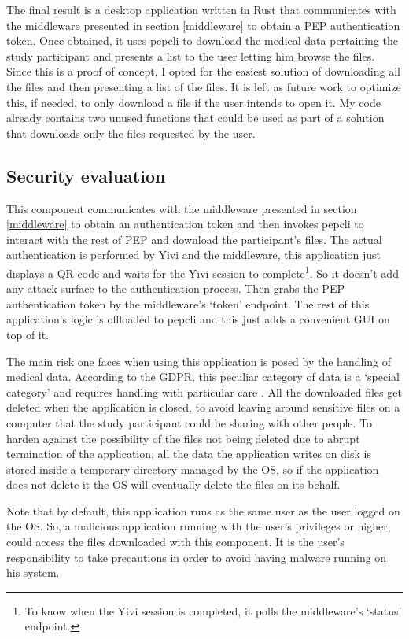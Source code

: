 \documentclass{report}
\begin{document}
The final result is a desktop application written in Rust that communicates with the middleware presented in section \ref{middleware} to obtain a PEP authentication token. Once
obtained, it uses pepcli to download the medical data pertaining the study participant and presents a list to the user letting him browse the files. Since this is a proof of
concept, I opted for the easiest solution of downloading all the files and then presenting a list of the files. It is left as future work to optimize this, if needed, to only download 
a file if the user intends to open it. My code already contains two unused functions that could be used as part of a solution that downloads only the files requested by the user.

\subsection{Security evaluation}
This component communicates with the middleware presented in section \ref{middleware} to obtain an authentication token and then invokes pepcli to interact with the rest of PEP and
download the participant's files. The actual authentication is performed by Yivi and the middleware, this application just displays a QR code and waits for the Yivi session to
complete\footnote{To know when the Yivi session is completed, it polls the middleware's \enquote*{status} endpoint.}. So it doesn't add any attack surface to the authentication
process. Then grabs the PEP authentication token by the middleware's \enquote*{token} endpoint. The rest of this application's logic is offloaded to pepcli and this just adds a
convenient GUI on top of it. \par
The main risk one faces when using this application is posed by the handling of medical data. According to the GDPR, this peculiar category of data is a \enquote*{special category}
and requires handling with particular care \cite{gdpr-art-9}. All the downloaded files get deleted when the application is closed, to avoid leaving around sensitive files on a
computer that the study participant could be sharing with other people. To harden against the possibility of the files not being deleted due to abrupt termination of the
application, all the data the application writes on disk is stored inside a temporary directory managed by the OS, so if the application does not delete it the OS will eventually
delete the files on its behalf. \par
Note that by default, this application runs as the same user as the user logged on the OS. So, a malicious application running with the user's privileges or higher, could access
the files downloaded with this component. It is the user's responsibility to take precautions in order to avoid having malware running on his system.
\end{document}

